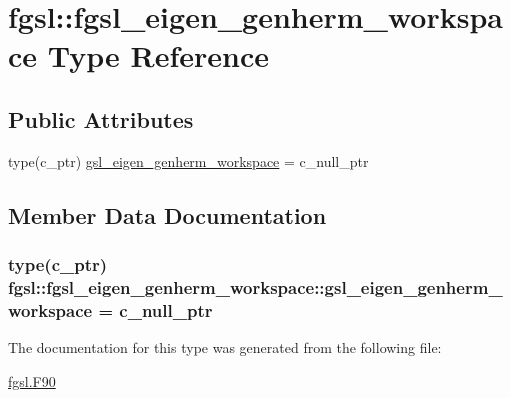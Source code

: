 \hypertarget{structfgsl_1_1fgsl__eigen__genherm__workspace}{\section{fgsl\-:\-:fgsl\-\_\-eigen\-\_\-genherm\-\_\-workspace Type Reference}
\label{structfgsl_1_1fgsl__eigen__genherm__workspace}
}
\subsection*{Public Attributes}
\begin{DoxyCompactItemize}
\item 
type(c\-\_\-ptr) \hyperlink{structfgsl_1_1fgsl__eigen__genherm__workspace_aec60111a47f5aa75025ed6cc45a24f3c}{gsl\-\_\-eigen\-\_\-genherm\-\_\-workspace} = c\-\_\-null\-\_\-ptr
\end{DoxyCompactItemize}


\subsection{Member Data Documentation}
\hypertarget{structfgsl_1_1fgsl__eigen__genherm__workspace_aec60111a47f5aa75025ed6cc45a24f3c}{
\subsubsection[{gsl\-\_\-eigen\-\_\-genherm\-\_\-workspace}]{\setlength{\rightskip}{0pt plus 5cm}type(c\-\_\-ptr) fgsl\-::fgsl\-\_\-eigen\-\_\-genherm\-\_\-workspace\-::gsl\-\_\-eigen\-\_\-genherm\-\_\-workspace = c\-\_\-null\-\_\-ptr}}\label{structfgsl_1_1fgsl__eigen__genherm__workspace_aec60111a47f5aa75025ed6cc45a24f3c}


The documentation for this type was generated from the following file\-:\begin{DoxyCompactItemize}
\item 
\hyperlink{fgsl_8F90}{fgsl.\-F90}\end{DoxyCompactItemize}
